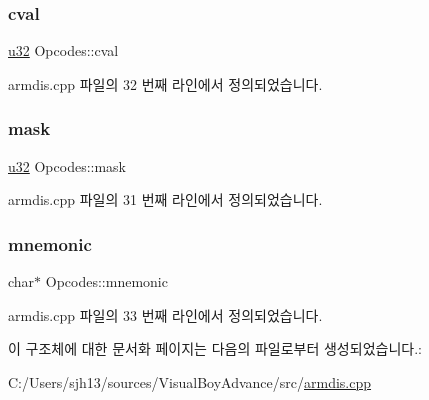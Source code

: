 \subsubsection{\texorpdfstring{cval}{cval}}
{\footnotesize\ttfamily \mbox{\hyperlink{_system_8h_a10e94b422ef0c20dcdec20d31a1f5049}{u32}} Opcodes\+::cval}



armdis.\+cpp 파일의 32 번째 라인에서 정의되었습니다.

\mbox{\label{struct_opcodes_a78e77d19cd457c2d1a665ccbcc5fef41}} 
\subsubsection{\texorpdfstring{mask}{mask}}
{\footnotesize\ttfamily \mbox{\hyperlink{_system_8h_a10e94b422ef0c20dcdec20d31a1f5049}{u32}} Opcodes\+::mask}



armdis.\+cpp 파일의 31 번째 라인에서 정의되었습니다.

\mbox{\label{struct_opcodes_a1999a6e81f58365cbd0164e5626d445a}} 
\subsubsection{\texorpdfstring{mnemonic}{mnemonic}}
{\footnotesize\ttfamily char$\ast$ Opcodes\+::mnemonic}



armdis.\+cpp 파일의 33 번째 라인에서 정의되었습니다.



이 구조체에 대한 문서화 페이지는 다음의 파일로부터 생성되었습니다.\+:\begin{DoxyCompactItemize}
\item 
C\+:/\+Users/sjh13/sources/\+Visual\+Boy\+Advance/src/\mbox{\hyperlink{armdis_8cpp}{armdis.\+cpp}}\end{DoxyCompactItemize}
